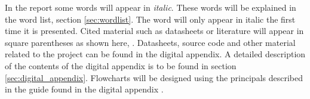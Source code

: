 \documentclass[../main.tex]{subfiles}
\begin{document}
In the report some words will appear in \textit{italic}. These words will be explained in the word list, section \ref{sec:wordlist}. The word will only appear in italic the first time it is presented. Cited material such as datasheets or literature will appear in square parentheses as shown here, \cite{universityofmichigan2019}. Datasheets, source code and other material related to the project can be found in the digital appendix. A detailed description of the contents of the digital appendix is to be found in section \ref{sec:digital_appendix}. Flowcharts will be designed using the principals described in the guide found in the digital appendix \cite{Flowchart_Symbols}.
\end{document}
